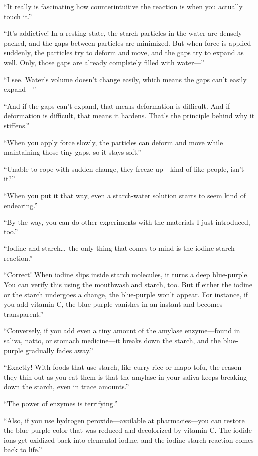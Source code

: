 \documentclass[
    a4paper,
    12pt,
    twoside,
    openany,
    UTF8,
    fontset=windows
]{ctexbook}
\begin{document}
``It really is fascinating how counterintuitive the reaction is when you actually touch it.''

``It's addictive! In a resting state, the starch particles in the water are densely packed, and the gaps between particles are minimized. But when force is applied suddenly, the particles try to deform and move, and the gaps try to expand as well. Only, those gaps are already completely filled with water---''

``I see. Water's volume doesn't change easily, which means the gaps can't easily expand---''

``And if the gaps can't expand, that means deformation is difficult. And if deformation is difficult, that means it hardens. That's the principle behind why it stiffens.''

``When you apply force slowly, the particles can deform and move while maintaining those tiny gaps, so it stays soft.''

``Unable to cope with sudden change, they freeze up---kind of like people, isn't it?''

``When you put it that way, even a starch-water solution starts to seem kind of endearing.''

``By the way, you can do other experiments with the materials I just introduced, too.''

``Iodine and starch\dots\ the only thing that comes to mind is the iodine-starch reaction.''

``Correct! When iodine slips inside starch molecules, it turns a deep blue-purple. You can verify this using the mouthwash and starch, too. But if either the iodine or the starch undergoes a change, the blue-purple won't appear. For instance, if you add vitamin C, the blue-purple vanishes in an instant and becomes transparent.''

``Conversely, if you add even a tiny amount of the amylase enzyme---found in saliva, natto, or stomach medicine---it breaks down the starch, and the blue-purple gradually fades away.''

``Exactly! With foods that use starch, like curry rice or mapo tofu, the reason they thin out as you eat them is that the amylase in your saliva keeps breaking down the starch, even in trace amounts.''

``The power of enzymes is terrifying.''

``Also, if you use hydrogen peroxide---available at pharmacies---you can restore the blue-purple color that was reduced and decolorized by vitamin C. The iodide ions get oxidized back into elemental iodine, and the iodine-starch reaction comes back to life.''
\end{document}
